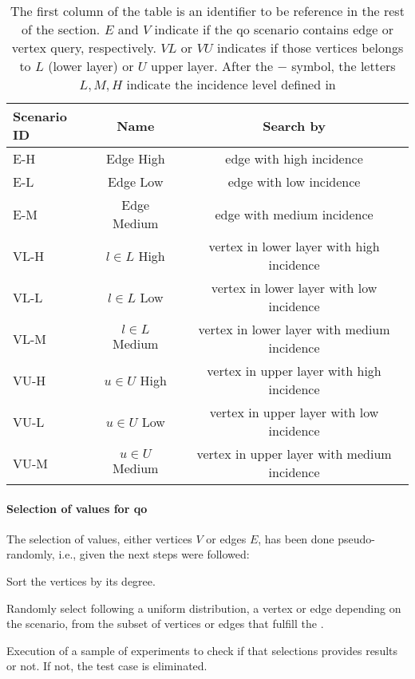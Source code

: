 \begin{table}[H]
  \centering
  \begin{tabular}{|l|c|c|}
    \hline
    \textbf{Scenario ID} & \textbf{Name} & \textbf{Search by}\\
    \hline
    E-H & Edge High & edge with high incidence \\
    \hline
    E-L & Edge Low & edge with low incidence \\
    \hline
    E-M & Edge Medium & edge with medium incidence \\
    \hline
    VL-H & $l \in L$ High & vertex in lower layer with high incidence \\
    \hline
    VL-L & $l \in L$ Low & vertex in lower layer with low incidence \\
    \hline
    VL-M & $l \in L$ Medium & vertex in lower layer with medium incidence \\
    \hline
    VU-H & $u \in U$ High & vertex in upper layer with high incidence \\
    \hline
    VU-L & $u \in U$ Low & vertex in upper layer with low incidence \\
    \hline
    VU-M & $u \in U$ Medium & vertex in upper layer with medium incidence \\
    \hline
  \end{tabular}
  \caption[{[EE] Experiment Data Setup for experiments}]{The first column of the table is an identifier to be reference in the rest of the section. $E$ and $V$ indicate if the \acrshort{qo} scenario contains edge or vertex query, respectively. $VL$ or $VU$ indicates if those vertices belongs to $L$ (lower layer) or $U$ upper layer. After the $-$ symbol, the letters $L,M,H$ indicate the incidence level defined in }
  \label{table:exp:data-setup}
  \end{table}

\paragraph{Selection of values for \acrshort{qo}}\label{sub:exp:sel-vals} The selection of values, either vertices $V$ or edges $E$, has been done pseudo-randomly, i.e., given  the next steps were followed: \begin{inparaenum}[\bf i\upshape)]
  \item Sort the vertices by its degree.
  \item Randomly select following a uniform distribution,  a vertex or edge depending on the scenario, from the subset of vertices or edges that fulfill the .
  \item Execution of a sample of experiments to check if that selections provides results or not. If not, the test case is eliminated.
\end{inparaenum}
  
